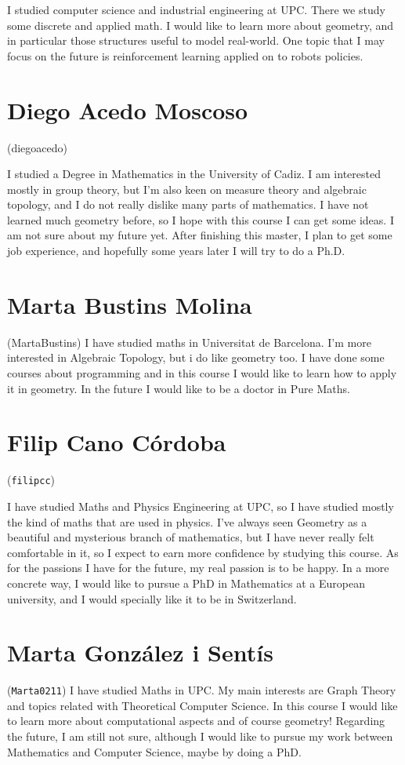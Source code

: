 \documentclass[11pt]{amsart}
\begin{document}
I  studied computer science and industrial engineering at UPC. There we study some discrete and applied math. I would like to learn more about geometry, and in particular those structures useful to model real-world. One topic that I may focus on the future is reinforcement learning applied on to robots policies. 

\section*{Diego Acedo Moscoso}
(diegoacedo)

I studied a Degree in Mathematics in the University of Cadiz. I am interested mostly in group theory, but I'm also keen on measure theory and algebraic topology, and I do not really dislike many parts of mathematics. I have not learned much geometry before, so I hope with this course I can get some ideas.
I am not sure about my future yet. After finishing this master, I plan to get some job experience, and hopefully some years later I will try to do a Ph.D.

\medskip

\section*{Marta Bustins Molina} 
(MartaBustins) 
I have studied maths in Universitat de Barcelona. I'm more interested in Algebraic Topology, but i do like geometry too. I have done some courses about programming and in this course I would like to learn how to apply it in geometry. In the future I would like to be a doctor in Pure Maths.

\medskip

\section*{Filip Cano Córdoba}
(\texttt{filipcc})

I have studied Maths and Physics Engineering at UPC,
so I have studied mostly the kind of maths that are used in physics.
I've always seen Geometry as a beautiful and mysterious branch of mathematics,
but I have never really felt comfortable in it, so I expect to earn more confidence by
studying this course.  
As for the passions I have for the future, 
my real passion is to be happy. 
In a more concrete way, I would like to pursue a PhD in Mathematics at a European 
university, and I would specially like it to be in Switzerland.


\medskip

\section*{Marta González i Sentís}
(\texttt{Marta0211})
I have studied Maths in UPC. My main interests are Graph Theory and topics related with Theoretical Computer Science. In this course I would like to learn more about computational aspects and of course geometry! Regarding the future, I am still not sure, although I would like to pursue my work between Mathematics and Computer Science, maybe by doing a PhD.
\end{document}
